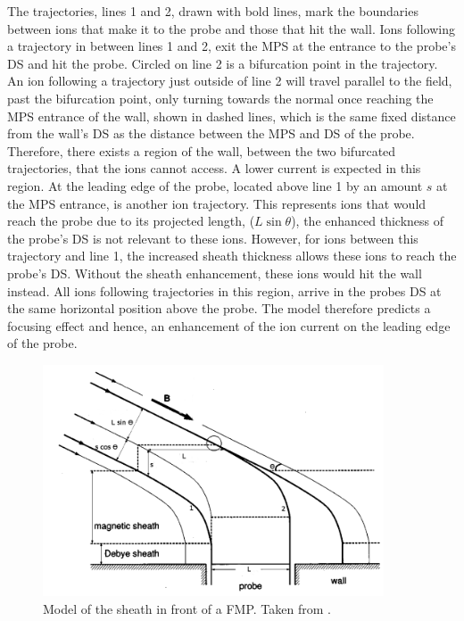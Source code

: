 The trajectories, lines 1 and 2, drawn with bold lines, mark the boundaries between ions that make it to the probe and those that hit the wall. Ions following a trajectory in between lines 1 and 2, exit the MPS at the entrance to the probe's DS and hit the probe.  Circled on line 2 is a bifurcation point in the trajectory. An ion following a trajectory just outside of line 2 will travel parallel to the field, past the bifurcation point, only turning towards the normal once reaching the MPS entrance of the wall, shown in dashed lines, which is the same fixed distance from the wall's DS as the distance between the MPS and DS of the probe. Therefore, there exists a region of the wall, between the two bifurcated trajectories, that the ions cannot access. A lower current is expected in this region. At the leading edge of the probe, located above line 1 by an amount $s$ at the MPS entrance, is another ion trajectory. This represents ions that would reach the probe due to its projected length, ($L \sin \theta$), the enhanced thickness of the probe's DS is not relevant to these ions. However, for ions between this trajectory and line 1, the increased sheath thickness allows these ions to reach the probe's DS. Without the sheath enhancement, these ions would hit the wall instead. All ions following trajectories in this region, arrive in the probes DS at the same horizontal position above the probe. The model therefore predicts a focusing effect and hence, an enhancement of the ion current on the leading edge of the probe.
\begin{figure}[H]
\centering
\includegraphics[width=0.9\textwidth]{wc_sheath.png}
\caption{Model of the sheath in front of a FMP. Taken from \cite{asdex_FMP}.}
\label{fig:wc-sheath}
\end{figure}

